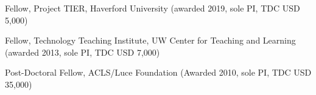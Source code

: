 
\ind Fellow, Project TIER, Haverford University (awarded 2019, sole PI, TDC USD 5,000)

\ind Fellow, Technology Teaching Institute, UW Center for Teaching and Learning (awarded 2013, sole PI, TDC USD 7,000)

\ind Post-Doctoral Fellow, ACLS/Luce Foundation (Awarded 2010, sole PI, TDC USD 35,000)
